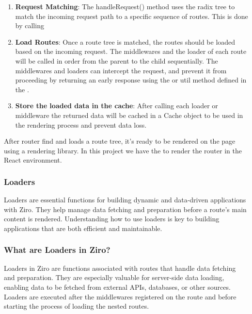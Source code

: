 \begin{enumerate}
  \item \textbf{Request Matching}: The handleRequest() method uses the radix tree to match the incoming request path to a specific sequence of routes. This is done by calling 

  \item \textbf{Load Routes}: Once a route tree is matched, the routes should be loaded based on the incoming request. The middlewares and the loader of each route will be called in order from the parent to the child sequentially. The middlewares and loaders can intercept the request, and prevent it from proceeding by returning an early response using the  or  util method defined in the .

  \item \textbf{Store the loaded data in the cache}: After calling each loader or middleware the returned data will be cached in a Cache object to be used in the rendering process and prevent data loss.

\end{enumerate}

After router find and loads a route tree, it's ready to be rendered on the page using a rendering library. In this project we have the  to render the router in the React environment.


\subsubsection{Loaders}
Loaders are essential functions for building dynamic and data-driven applications with Ziro. They help manage data fetching and preparation before a route’s main content is rendered. Understanding how to use loaders is key to building applications that are both efficient and maintainable.

\subsubsection*{What are Loaders in Ziro?}
Loaders in Ziro are functions associated with routes that handle data fetching and preparation. They are especially valuable for server-side data loading, enabling data to be fetched from external APIs, databases, or other sources. Loaders are executed after the middlewares registered on the route and before starting the process of loading the nested routes.

